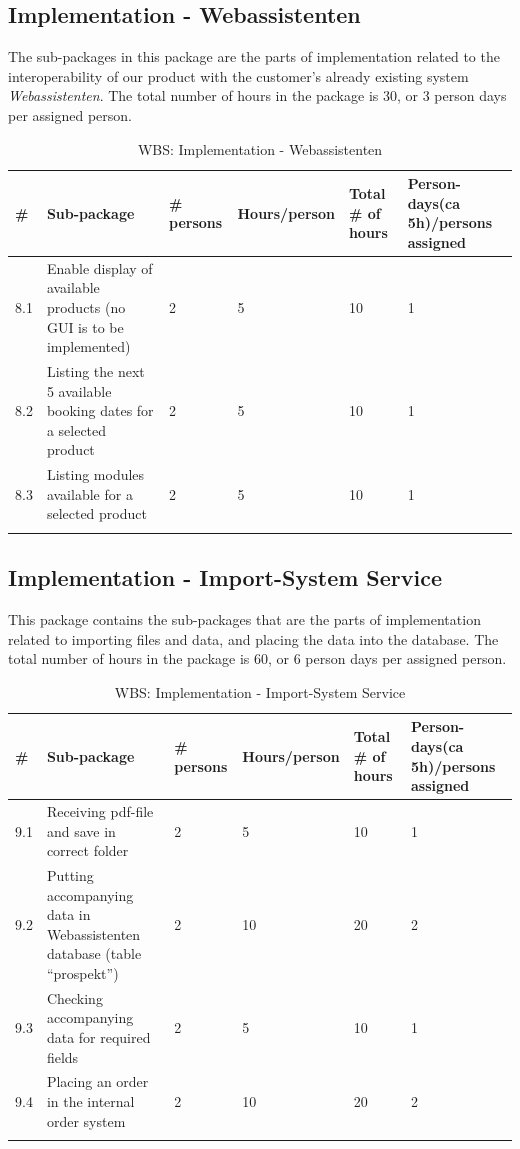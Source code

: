 \newpage
\subsection{Implementation - Webassistenten}
The sub-packages in this package are the parts of implementation related to the interoperability of our product with the customer's already existing system \\ \emph{Webassistenten}. The total number of hours in the package is 30, or 3 person days per assigned person.
\begin{longtable}{|p{0.7cm}|p{3cm}|p{1.8cm}|p{2.5cm}|p{2cm}|p{2.8cm}|}
\hline
\# & Sub-package & \# persons & Hours/person & Total \# of hours & Person-days(ca 5h)/persons assigned\\ 
\hline
8.1 & Enable display of available products (no GUI is to be implemented) & 2 & 5 & 10 & 1\\ 
\hline
8.2 & Listing the next 5 available booking dates for a selected product & 2 & 5 & 10 & 1\\ 
\hline
8.3 & Listing modules available for a selected product & 2 & 5 & 10 & 1\\ 
\hline
\caption{WBS: Implementation - Webassistenten}
\end{longtable}

\newpage
\subsection{Implementation - Import-System Service}
This package contains the sub-packages that are the parts of implementation related to importing files and data, and placing the data into the database. The total number of hours in the package is 60, or 6 person days per assigned person.
\begin{longtable}{|p{0.7cm}|p{3cm}|p{1.8cm}|p{2.5cm}|p{2cm}|p{2.8cm}|}
\hline
\# & Sub-package & \# persons & Hours/person & Total \# of hours & Person-days(ca 5h)/persons assigned\\ 
\hline
9.1 & Receiving pdf-file and save in correct folder & 2 & 5 & 10 & 1\\ 
\hline
9.2 & Putting accompanying data in Webassistenten database (table “prospekt”) & 2 & 10 & 20 & 2\\ 
\hline
9.3 & Checking accompanying data for required fields & 2 & 5 & 10 & 1\\ 
\hline
9.4 & Placing an order in the internal order system & 2 & 10 & 20 & 2\\ 
\hline\caption{WBS: Implementation - Import-System Service}
\end{longtable}

